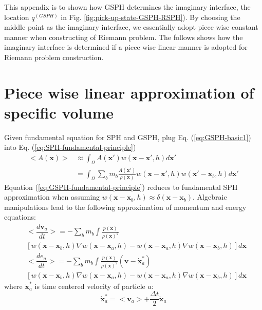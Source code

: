  \label{app:determine-imag-int} 
This appendix is to shown how GSPH determines the imaginary interface, the location $q^(GSPH)$ in Fig. \ref{fig:pick-up-state-GSPH-RSPH}). By choosing the middle point as the imaginary interface, we essentially adopt piece wise constant manner when constructing of Riemann problem. The follows shows how the imaginary interface is determined if a piece wise linear manner is adopted for Riemann problem construction.

\section{Piece wise linear approximation of specific volume}
Given fundamental equation for SPH and GSPH, plug Eq. (\ref{eq:GSPH-basic1}) into Eq. (\ref{eq:SPH-fundamental-principle})
\begin{equation}
\begin{split}
<A\left(\textbf{x}\right)> 
& \approx \int_{\Omega} A\left(\textbf{x} \prime\right) w\left(\textbf{x}-\textbf{x}\prime, h\right) d\textbf{x}\prime \\
& = \int_{\Omega}  \sum_{b} m_{b} \frac{A\left(\textbf{x} \prime\right)}{\rho(\textbf{x})} w\left(\textbf{x}-\textbf{x}\prime, h\right) w(\textbf{x}\prime - \textbf{x}_{b}, h) d\textbf{x}\prime
\end{split}
\label{eq:GSPH-fundamental-principle}
\end{equation}
Equation (\ref{eq:GSPH-fundamental-principle}) reduces to fundamental SPH approximation when assuming $w(\textbf{x} - \textbf{x}_{b}, h) \approx \delta (\textbf{x} - \textbf{x}_{b})$. 
Algebraic manipulations \citep{inutsuka2002reformulation,iwasaki2011smoothed} lead to the following approximation of momentum and energy equations:
\begin{equation}
\begin{split}
&<\dfrac{d \textbf{v}_{a}}{dt}> =-\sum_{b} m_{b} \int \frac{p(\textbf{x})}{\rho(\textbf{x})^2} \\
&\left[w(\textbf{x} - \textbf{x}_b, h) \nabla w(\textbf{x} - \textbf{x}_a, h) - w(\textbf{x} - \textbf{x}_a, h) \nabla w(\textbf{x} - \textbf{x}_b, h)\right] d\textbf{x} 
\end{split}
\label{eq:gov-gsph-v-approx}
\end{equation}
\begin{equation}
\begin{split}
&<\dfrac{d e_{a}}{dt}> =-\sum_{b} m_{b} \int \frac{p(\textbf{x})}{\rho(\textbf{x})^2} (\textbf{v} - \dot{\textbf{x}}_{a}^{\ast})\\
&\left[ w(\textbf{x}- \textbf{x}_b, h) \nabla w(\textbf{x} - \textbf{x}_a, h) - w(\textbf{x} - \textbf{x}_a, h) \nabla w(\textbf{x} - \textbf{x}_b, h) \right] d\textbf{x} 
\end{split}
\label{eq:gov-gsph-e--approx}
\end{equation}
where $\dot{\textbf{x}}_{a}^{\ast}$ is time centered velocity of particle $a$:
\begin{equation}
\dot{\textbf{x}}_{a}^{\ast} = <\textbf{v}_{a}> + \frac{\Delta t}{2} \ddot{\textbf{x}}_{a}
\end{equation}

